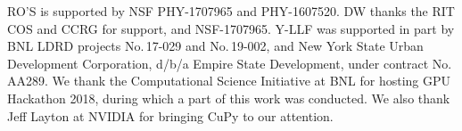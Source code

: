 \documentclass[twocolumn,prd,nofootinbib]{revtex4}
\begin{document}
\begin{acknowledgements}
RO'S is supported by NSF PHY-1707965 and PHY-1607520.
DW thanks the RIT COS and CCRG for support, and  NSF-1707965.
Y-LLF was supported in part by BNL LDRD projects No.\,17-029 and No.\,19-002, 
and New York State Urban Development Corporation, d/b/a Empire State Development, under contract No.\,AA289.
We thank the Computational Science Initiative at BNL for hosting GPU Hackathon 2018, during which a part of this work was conducted. We also thank Jeff Layton at NVIDIA for bringing CuPy to our attention.
\end{acknowledgements}



\end{document}

